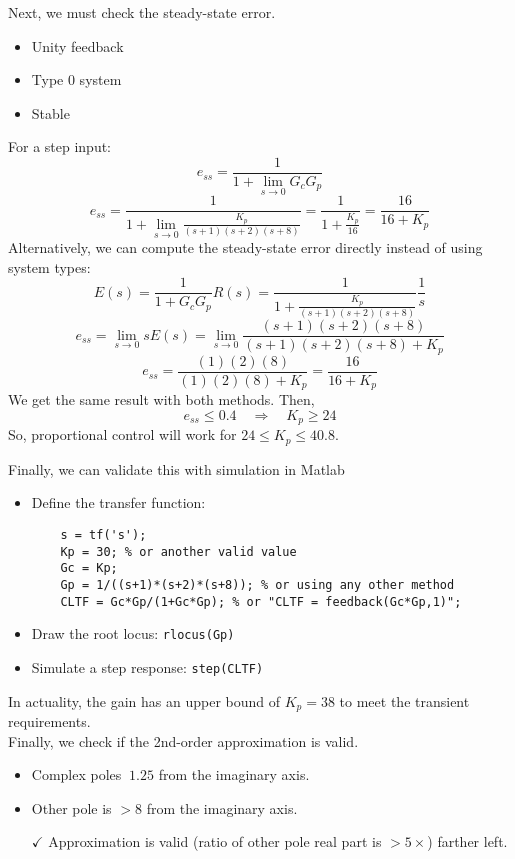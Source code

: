 \documentclass{book}
\begin{document}
Next, we must check the steady-state error.
\begin{itemize}
	\item Unity feedback
	\item Type 0 system
	\item Stable
\end{itemize}
For a step input:
\[ e_{ss} = \frac{1}{1+\lim_{s\to 0}G_cG_p} \]
\[ e_{ss} = \frac{1}{1+\lim_{s\to 0}\frac{K_p}{(s+1)(s+2)(s+8)}} = \frac{1}{1+\frac{K_p}{16}} = \frac{16}{16+K_p} \]
Alternatively, we can compute the steady-state error directly instead of using system types:
\[ E(s) = \frac{1}{1+G_cG_p}R(s) = \frac{1}{1+\frac{K_p}{(s+1)(s+2)(s+8)}}\frac{1}{s} \]
\[ e_{ss} = \lim_{s\to 0} sE(s) = \lim_{s\to 0} \frac{(s+1)(s+2)(s+8)}{(s+1)(s+2)(s+8)+K_p} \]
\[ e_{ss} = \frac{(1)(2)(8)}{(1)(2)(8)+K_p} = \frac{16}{16+K_p} \]
We get the same result with both methods. Then,
\[ e_{ss} \leq 0.4 \quad\Rightarrow\quad K_p \geq 24 \]
So, proportional control will work for $ 24 \leq K_p \leq 40.8 $.

Finally, we can validate this with simulation in Matlab
\begin{itemize}
	\item Define the transfer function: 
	\begin{verbatim}
	s = tf('s');
	Kp = 30; % or another valid value
	Gc = Kp;
	Gp = 1/((s+1)*(s+2)*(s+8)); % or using any other method
	CLTF = Gc*Gp/(1+Gc*Gp); % or "CLTF = feedback(Gc*Gp,1)";
	\end{verbatim}
	\item Draw the root locus: \texttt{rlocus(Gp)}
	\item Simulate a step response: \texttt{step(CLTF)}
\end{itemize}
In actuality, the gain has an upper bound of $ K_p=38 $ to meet the transient requirements.\\

\noindent Finally, we check if the 2nd-order approximation is valid.
\begin{itemize}
	\item Complex poles $ ~1.25 $ from the imaginary axis.
	\item Other pole is $ > 8 $ from the imaginary axis.
	\item[$ \checkmark $] Approximation is valid (ratio of other pole real part is $ >5\times $) farther left.
\end{itemize}
\end{document}
